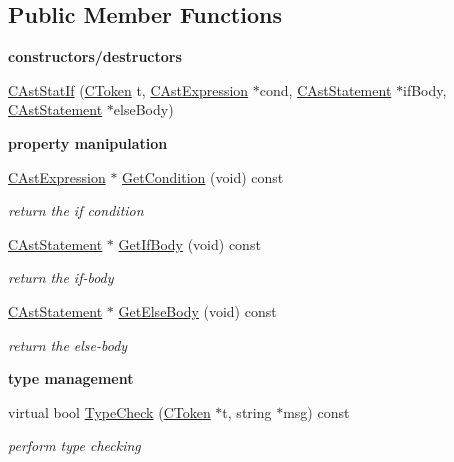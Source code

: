 \subsection*{Public Member Functions}
\begin{Indent}{\bf constructors/destructors}\par
\begin{DoxyCompactItemize}
\item 
\hyperlink{classCAstStatIf_adbd183134b4367cc0a4a7f0aa8fdbd51}{C\-Ast\-Stat\-If} (\hyperlink{classCToken}{C\-Token} t, \hyperlink{classCAstExpression}{C\-Ast\-Expression} $\ast$cond, \hyperlink{classCAstStatement}{C\-Ast\-Statement} $\ast$if\-Body, \hyperlink{classCAstStatement}{C\-Ast\-Statement} $\ast$else\-Body)
\end{DoxyCompactItemize}
\end{Indent}
\begin{Indent}{\bf property manipulation}\par
\begin{DoxyCompactItemize}
\item 
\hyperlink{classCAstExpression}{C\-Ast\-Expression} $\ast$ \hyperlink{classCAstStatIf_a7ebea2591c30090ae3a929896945752e}{Get\-Condition} (void) const 
\begin{DoxyCompactList}\small\item\em return the if condition \end{DoxyCompactList}\item 
\hyperlink{classCAstStatement}{C\-Ast\-Statement} $\ast$ \hyperlink{classCAstStatIf_aa89939ab6fb33d61ce990497bf3850d4}{Get\-If\-Body} (void) const 
\begin{DoxyCompactList}\small\item\em return the if-\/body \end{DoxyCompactList}\item 
\hyperlink{classCAstStatement}{C\-Ast\-Statement} $\ast$ \hyperlink{classCAstStatIf_aeb3900eba5d267d1d783da9a36540c98}{Get\-Else\-Body} (void) const 
\begin{DoxyCompactList}\small\item\em return the else-\/body \end{DoxyCompactList}\end{DoxyCompactItemize}
\end{Indent}
\begin{Indent}{\bf type management}\par
\begin{DoxyCompactItemize}
\item 
virtual bool \hyperlink{classCAstStatIf_a63d14c54cc9db5aa4438863446a24a27}{Type\-Check} (\hyperlink{classCToken}{C\-Token} $\ast$t, string $\ast$msg) const 
\begin{DoxyCompactList}\small\item\em perform type checking \end{DoxyCompactList}\end{DoxyCompactItemize}
\end{Indent}

